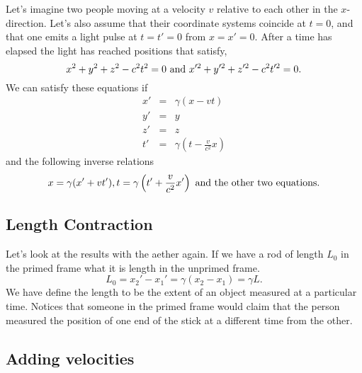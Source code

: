 Let's imagine two people moving at a velocity $v$ relative to each
other in the $x$-direction.   Let's also assume that their coordinate
systems coincide at $t=0$, and that one emits a light pulse at
$t=t'=0$ from $x=x'=0$.  After a time has elapsed the light has
reached positions that satisfy,
\begin{equation}
x^2+y^2+z^2 - c^2 t^2 = 0 ~\hbox{\rm and}~
x'^2+y'^2+z'^2 - c^2 t'^2 = 0.
\label{eq:267}
\end{equation}
We can satisfy these equations if
\begin{eqnarray}
x' &=& \gamma (x-vt) \\
y' &=& y \\
z' &=& z \\
t' &=& \gamma \left ( t - \frac{v}{c^2} x \right )
\label{eq:268}
\end{eqnarray}
and the following inverse relations
\begin{equation}
x = \gamma ( x' + v t'), t=\gamma \left (t'+\frac{v}{c^2} x' \right
)~\hbox{\rm and the other two equations.}
\label{eq:269}
\end{equation}

\subsection{Length Contraction}
\label{sec:length-contraction}

Let's look at the results with the aether again.   If we have a rod of
length $L_0$ in the primed frame what it is length in the unprimed
frame.
\begin{equation}
L_0 = x_2' - x_1' = \gamma ( x_2 - x_1 ) = \gamma L.
\label{eq:270}
\end{equation}
We have define the length to be the extent of an object measured at a
particular time.  Notices that someone in the primed frame would claim
that the person measured the position of one end of the stick at a
different time from the other.

\subsection{Adding velocities}
\label{sec:adding-velocities}

